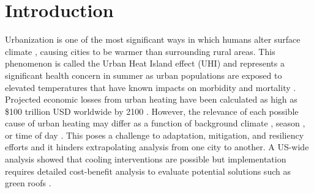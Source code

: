 \documentclass[12pt]{iopart}
\begin{document}
\section*{Introduction}

Urbanization is one of the most significant ways in which humans alter surface climate \cite{kalnay2003impact}, causing cities to be warmer than surrounding rural areas. This phenomenon is called the Urban Heat Island effect (UHI) and represents a significant health concern in summer as urban populations are exposed to elevated temperatures \cite{luber2008climate} that have known impacts on morbidity and mortality \cite{wmo}. Projected economic losses from urban heating have been calculated as high as \$100 trillion USD worldwide by 2100 \cite{estrada2017global}.
However, the relevance of each possible cause of urban heating may differ as a function of background climate \cite{zhao2014strong}, season \cite{arnfield2003two}, or time of day \cite{peng2011surface}. 
This poses a challenge to adaptation, mitigation, and resiliency efforts \cite{stone2012managing} and it hinders extrapolating analysis from one city to another. A US-wide analysis showed that cooling interventions are possible \cite{georgescu2014urban}
but implementation requires detailed cost-benefit analysis \cite{aerts2014evaluating} to evaluate potential solutions such as green roofs \cite{li2014effectiveness,sharma2016green,coffee2010preparing}. 
\end{document}
